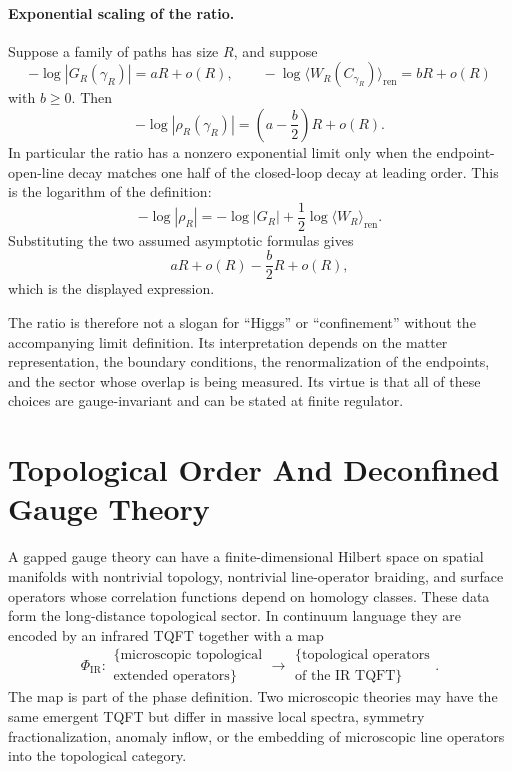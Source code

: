 \paragraph{Exponential scaling of the ratio.}
Suppose a family of paths has size \(R\), and suppose
\[
  -\log |G_R(\gamma_R)|=aR+o(R),
  \qquad
  -\log \langle W_R(C_{\gamma_R})\rangle_{\mathrm{ren}}=bR+o(R)
\]
with \(b\geq0\).  Then
\[
  -\log |\rho_R(\gamma_R)|
  =
  \left(a-\frac b2\right)R+o(R).
\]
In particular the ratio has a nonzero exponential limit only when the
endpoint-open-line decay matches one half of the closed-loop decay at leading
order.
This is the logarithm of the definition:
\[
  -\log|\rho_R|
  =
  -\log|G_R|+\frac12\log\langle W_R\rangle_{\mathrm{ren}}.
\]
Substituting the two assumed asymptotic formulas gives
\[
  aR+o(R)-\frac b2R+o(R),
\]
which is the displayed expression.

The ratio is therefore not a slogan for ``Higgs'' or ``confinement'' without
the accompanying limit definition.  Its interpretation depends on the matter
representation, the boundary conditions, the renormalization of the endpoints,
and the sector whose overlap is being measured.  Its virtue is that all of
these choices are gauge-invariant and can be stated at finite regulator.

\section{Topological Order And Deconfined Gauge Theory}

A gapped gauge theory can have a finite-dimensional Hilbert space on spatial
manifolds with nontrivial topology, nontrivial line-operator braiding, and
surface operators whose correlation functions depend on homology classes.
These data form the long-distance topological sector.  In continuum language
they are encoded by an infrared TQFT together with a map
\[
  \Phi_{\mathrm{IR}}:
  \begin{array}{c}
  \{\text{microscopic topological}\\
  \text{extended operators}\}
  \end{array}
  \longrightarrow
  \begin{array}{c}
  \{\text{topological operators}\\
  \text{of the IR TQFT}\}
  \end{array}.
\]
The map is part of the phase definition.  Two microscopic theories may have
the same emergent TQFT but differ in massive local spectra, symmetry
fractionalization, anomaly inflow, or the embedding of microscopic line
operators into the topological category.

